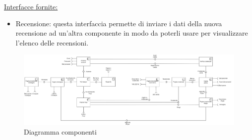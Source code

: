 \documentclass[a4paper,12pt]{article}
\begin{document}
\underline{Interfacce fornite:}
\begin{itemize}
\item Recensione: questa interfaccia permette di inviare i dati della nuova recensione ad un'altra componente in modo da poterli usare per visualizzare l'elenco delle recensioni.
\end{itemize}



\begin{figure}[H]
   \centering
   \includegraphics[width=1.5\textwidth, angle = 90]{
    img-D2/diagramma_componenti.png}
    \caption{Diagramma componenti}
\end{figure}
\end{document}
